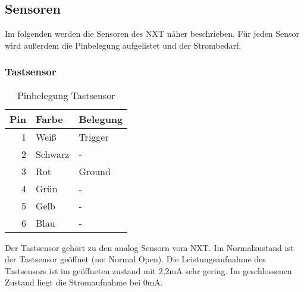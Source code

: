 \subsection{Sensoren}\label{eb:sensor}

Im folgenden werden die Sensoren des NXT näher beschrieben. Für jeden Sensor wird außerdem die Pinbelegung aufgelistet und der Strombedarf.

\subsubsection{Tastsensor}
\begin{table}[!ht]
\centering
\rmfamily
\caption{Pinbelegung Tastsensor}
\renewcommand{\arraystretch}{1.1}
\sffamily
\begin{footnotesize}
\begin{tabular}{r | l l}
\toprule
\textbf{Pin} & \textbf{Farbe}  & \textbf{Belegung}\\
\midrule
1 & Weiß & Trigger \\
2 & Schwarz & - \\
3 & Rot & Ground \\
4 & Grün & - \\
5 & Gelb & - \\
6 & Blau & - \\
\bottomrule
\end{tabular}
\end{footnotesize}
\label{tastsensor:tbl}
\end{table}
Der Tastsensor gehört zu den analog Sensorn vom NXT. Im Normalzustand ist der Tastsensor geöffnet (no: Normal Open). Die Leistungsaufnahme des Tastsensors ist im geöffneten zustand mit 2,2mA sehr gering. Im geschlossenen Zustand liegt die Stromaufnahme bei 0mA.


